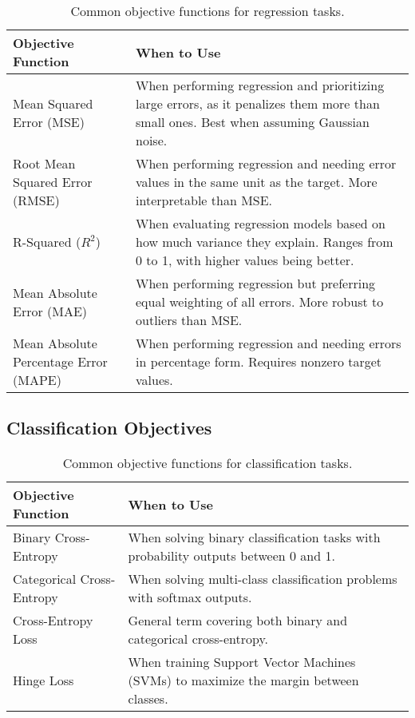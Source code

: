 \documentclass[12pt,openany]{book}
\begin{document}
\begin{table}[H]
    \centering
    \small
    \renewcommand{\arraystretch}{1.3}
    \begin{tabular}{|l|p{9cm}|}
        \hline
        \textbf{Objective Function} & \textbf{When to Use} \\
        \hline
        Mean Squared Error (MSE) & When performing regression and prioritizing large errors, as it penalizes them more than small ones. Best when assuming Gaussian noise. \\
        \hline
        Root Mean Squared Error (RMSE) & When performing regression and needing error values in the same unit as the target. More interpretable than MSE. \\
        \hline
        R-Squared (\( R^2 \)) & When evaluating regression models based on how much variance they explain. Ranges from 0 to 1, with higher values being better. \\
        \hline
        Mean Absolute Error (MAE) & When performing regression but preferring equal weighting of all errors. More robust to outliers than MSE. \\
        \hline
        Mean Absolute Percentage Error (MAPE) & When performing regression and needing errors in percentage form. Requires nonzero target values. \\
        \hline
    \end{tabular}
    \caption{Common objective functions for regression tasks.}
\end{table}

\subsection{Classification Objectives}

\begin{table}[H]
    \centering
    \small
    \renewcommand{\arraystretch}{1.3}
    \begin{tabular}{|l|p{9cm}|}
        \hline
        \textbf{Objective Function} & \textbf{When to Use} \\
        \hline
        Binary Cross-Entropy & When solving binary classification tasks with probability outputs between 0 and 1. \\
        \hline
        Categorical Cross-Entropy & When solving multi-class classification problems with softmax outputs. \\
        \hline
        Cross-Entropy Loss & General term covering both binary and categorical cross-entropy. \\
        \hline
        Hinge Loss & When training Support Vector Machines (SVMs) to maximize the margin between classes. \\
        \hline
    \end{tabular}
    \caption{Common objective functions for classification tasks.}
\end{table}
\end{document}
